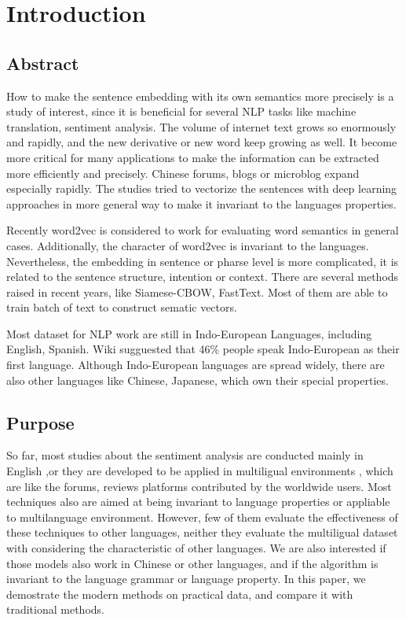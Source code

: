 \chapter{Introduction}
\setlength{\baselineskip}{1.5em}
\setlength{\parindent}{2em}
\setlength{\parskip}{1em}

\section{Abstract}

How to make the sentence embedding with its own semantics more precisely is a study of interest, since it is beneficial for several NLP tasks like machine translation, sentiment analysis. 
The volume of internet text grows so enormously and rapidly, and the new derivative or new word keep growing as well.
It become more critical for many applications to make the information can be extracted more efficiently and precisely.  
Chinese forums, blogs or microblog expand especially rapidly. The studies tried to vectorize the sentences with deep learning approaches in more general way to make it invariant to the languages properties.  


Recently word2vec\cite{word2vec} is considered to work for evaluating word semantics in general cases.  
Additionally, the character of word2vec is invariant to the languages. Nevertheless, 
the embedding in sentence or pharse level is more complicated, it is related to the sentence structure,  
intention or context. There are several methods raised in recent years, like Siamese-CBOW, FastText. 
Most of them are able to train batch of text to construct sematic vectors.

Most dataset for NLP work are still in Indo-European Languages, including English, Spanish. Wiki sugguested that 46\% people speak Indo-European as their first language. 
Although Indo-European languages are spread widely, there are also other languages like Chinese, Japanese, which own their special properties.

\section{Purpose}

So far, most studies about the sentiment analysis are conducted mainly in English ,or they are developed to be applied in multiligual environments
, which are like the forums, reviews platforms contributed by the worldwide users. Most techniques also are aimed at being invariant to language properties or appliable to multilanguage environment. 
However, few of them evaluate the effectiveness of these techniques to other languages, neither they evaluate the multiligual dataset with considering the characteristic of other languages.   
We are also interested if those models also work in Chinese or other languages, and if the algorithm is invariant to the language grammar or language property. 
In this paper, we demostrate the modern methods on practical data, and compare it with traditional methods.